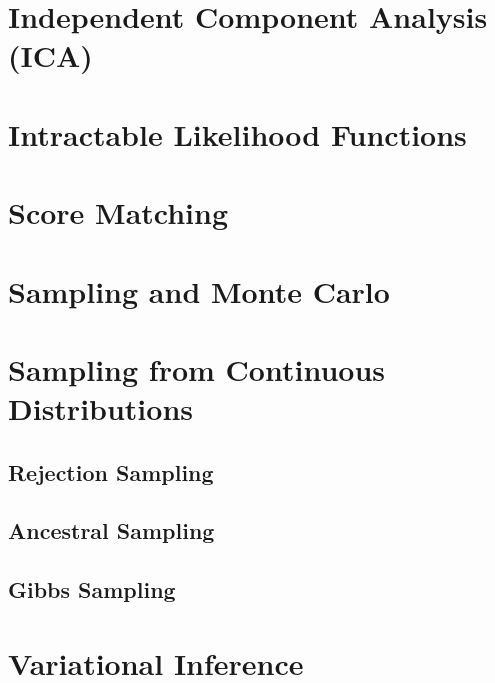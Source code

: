 \documentclass{article}
\begin{document}
\section{Independent Component Analysis (ICA)}

\section{Intractable Likelihood Functions}
\section{Score Matching}
\section{Sampling and Monte Carlo}

\section{Sampling from Continuous Distributions}
\subsection{Rejection Sampling}
\subsection{Ancestral Sampling}
\subsection{Gibbs Sampling}

\section{Variational Inference}


\end{document}
